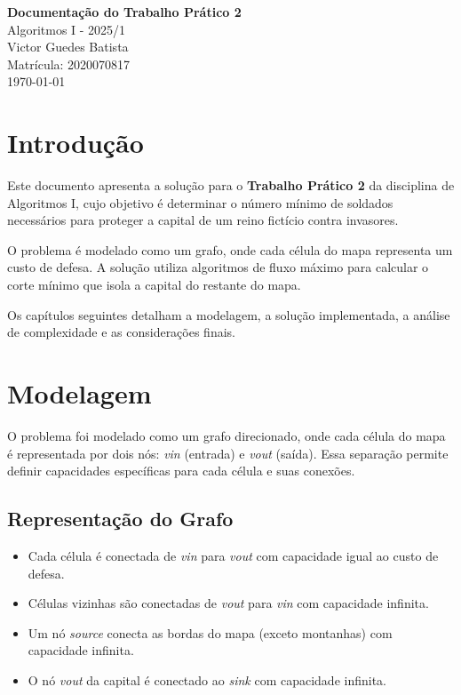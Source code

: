 \documentclass[a4paper,12pt]{article}
\begin{document}
\begin{center}
    \Large\textbf{Documentação do Trabalho Prático 2} \\
    \large Algoritmos I - 2025/1 \\[1em]
    Victor Guedes Batista \\ Matrícula: 2020070817 \\[1em]
    \today
\end{center}

\section*{Introdução}

Este documento apresenta a solução para o \textbf{Trabalho Prático 2} da disciplina de Algoritmos I, cujo objetivo é determinar o número mínimo de soldados necessários para proteger a capital de um reino fictício contra invasores.

O problema é modelado como um grafo, onde cada célula do mapa representa um custo de defesa. A solução utiliza algoritmos de fluxo máximo para calcular o corte mínimo que isola a capital do restante do mapa.

Os capítulos seguintes detalham a modelagem, a solução implementada, a análise de complexidade e as considerações finais.

\section*{Modelagem}

O problema foi modelado como um grafo direcionado, onde cada célula do mapa é representada por dois nós: \textit{vin} (entrada) e \textit{vout} (saída). Essa separação permite definir capacidades específicas para cada célula e suas conexões.

\subsection*{Representação do Grafo}

\begin{itemize}
    \item Cada célula é conectada de \textit{vin} para \textit{vout} com capacidade igual ao custo de defesa.
    \item Células vizinhas são conectadas de \textit{vout} para \textit{vin} com capacidade infinita.
    \item Um nó \textit{source} conecta as bordas do mapa (exceto montanhas) com capacidade infinita.
    \item O nó \textit{vout} da capital é conectado ao \textit{sink} com capacidade infinita.
\end{itemize}
\end{document}
